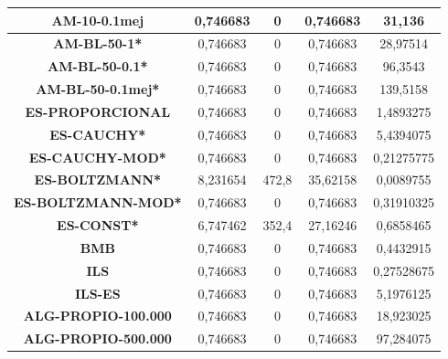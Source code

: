 \documentclass[12pt, spanish]{article}
\begin{document}
\begin{table}[H]
\begin{tabular}{|c|c|c|c|c|}
\textbf{AM-10-0.1mej}       & 0,746683                  & 0                           & 0,746683               & 31,136     \\ \hline
\textbf{AM-BL-50-1*}        & 0,746683                  & 0                           & 0,746683               & 28,97514   \\ \hline
\textbf{AM-BL-50-0.1*}      & 0,746683                  & 0                           & 0,746683               & 96,3543    \\ \hline
\textbf{AM-BL-50-0.1mej*}   & 0,746683                  & 0                           & 0,746683               & 139,5158   \\ \hline
\textbf{ES-PROPORCIONAL}    & 0,746683                  & 0                           & 0,746683               & 1,4893275  \\ \hline
\textbf{ES-CAUCHY*}         & 0,746683                  & 0                           & 0,746683               & 5,4394075  \\ \hline
\textbf{ES-CAUCHY-MOD*}     & 0,746683                  & 0                           & 0,746683               & 0,21275775 \\ \hline
\textbf{ES-BOLTZMANN*}      & 8,231654                  & 472,8                       & 35,62158               & 0,0089755  \\ \hline
\textbf{ES-BOLTZMANN-MOD*}  & 0,746683                  & 0                           & 0,746683               & 0,31910325 \\ \hline
\textbf{ES-CONST*}          & 6,747462                  & 352,4                       & 27,16246               & 0,6858465  \\ \hline
\textbf{BMB}                & 0,746683                  & 0                           & 0,746683               & 0,4432915  \\ \hline
\textbf{ILS}                & 0,746683                  & 0                           & 0,746683               & 0,27528675 \\ \hline
\textbf{ILS-ES}             & 0,746683                  & 0                           & 0,746683               & 5,1976125  \\ \hline
\textbf{ALG-PROPIO-100.000} & 0,746683                  & 0                           & 0,746683               & 18,923025  \\ \hline
\textbf{ALG-PROPIO-500.000} & 0,746683                  & 0                           & 0,746683               & 97,284075  \\ \hline
\end{tabular}
\end{table}
\end{document}
